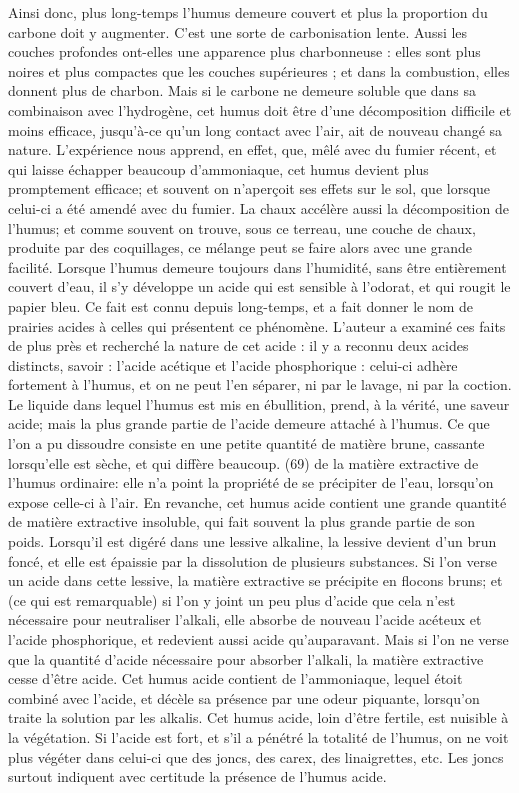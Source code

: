 Ainsi donc, plus long-temps l'humus demeure couvert et plus la proportion du carbone doit y augmenter. C'est une sorte de carbonisation lente. Aussi les couches profondes ont-elles une apparence plus charbonneuse : elles sont plus noires et plus compactes que les couches supérieures ; et dans la combustion, elles donnent plus de charbon. Mais si le carbone ne demeure soluble que dans sa combinaison avec l'hydrogène, cet humus doit être d'une décomposition difficile et moins efficace, jusqu'à-ce qu'un long contact avec l'air, ait de nouveau changé sa nature. L'expérience nous apprend, en effet, que, mêlé avec du fumier récent, et qui laisse échapper beaucoup d'ammoniaque, cet\setcounter{page}{68} humus devient plus promptement efficace; et souvent on n'aperçoit ses effets sur le sol, que lorsque celui-ci a été amendé avec du fumier.
La chaux accélère aussi la décomposition de l'humus; et comme souvent on trouve, sous ce terreau, une couche de chaux, produite par des coquillages, ce mélange peut se faire alors avec une grande facilité.
Lorsque l'humus demeure toujours dans l'humidité, sans être entièrement couvert d'eau, il s'y développe un acide qui est sensible à l'odorat, et qui rougit le papier bleu. Ce fait est connu depuis long-temps, et a fait donner le nom de prairies acides à celles qui présentent ce phénomène. L'auteur a examiné ces faits de plus près et recherché la nature de cet acide : il y a reconnu deux acides distincts, savoir : l'acide acétique et l'acide phosphorique : celui-ci adhère fortement à l'humus, et on ne peut l'en séparer, ni par le lavage, ni par la coction. Le liquide dans lequel l'humus est mis en ébullition, prend, à la vérité, une saveur acide; mais la plus grande partie de l'acide demeure attaché à l'humus. Ce que l'on a pu dissoudre consiste en une petite quantité de matière brune, cassante lorsqu'elle est sèche, et qui diffère beaucoup.\setcounter{page}{69} (69) de la matière extractive de l'humus ordinaire: elle n'a point la propriété de se précipiter de l'eau, lorsqu'on expose celle-ci à l'air. En revanche, cet humus acide contient une grande quantité de matière extractive insoluble, qui fait souvent la plus grande partie de son poids. Lorsqu'il est digéré dans une lessive alkaline, la lessive devient d'un brun foncé, et elle est épaissie par la dissolution de plusieurs substances. Si l'on verse un acide dans cette lessive, la matière extractive se précipite en flocons bruns; et (ce qui est remarquable) si l'on y joint un peu plus d'acide que cela n'est nécessaire pour neutraliser l'alkali, elle absorbe de nouveau l'acide acéteux et l'acide phosphorique, et redevient aussi acide qu'auparavant. Mais si l'on ne verse que la quantité d'acide nécessaire pour absorber l'alkali, la matière extractive cesse d'être acide. Cet humus acide contient de l'ammoniaque, lequel étoit combiné avec l'acide, et décèle sa présence par une odeur piquante, lorsqu'on traite la solution par les alkalis. Cet humus acide, loin d'être fertile, est nuisible à la végétation. Si l'acide est fort, et s'il a pénétré la totalité de l'humus, on ne voit plus végéter dans celui-ci que des joncs, des carex, des linaigrettes, etc. Les joncs surtout\setcounter{page}{70} indiquent avec certitude la présence de l'humus acide.
